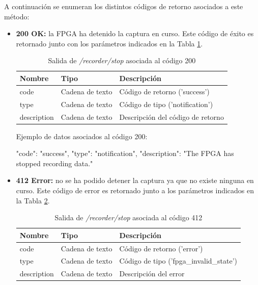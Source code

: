 A continuación se enumeran los distintos códigos de retorno asociados a este método:
\begin{itemize}

\item{\textbf{200 OK:} la \gls{FPGA} ha detenido la captura en curso. Este código de éxito es retornado junto con los parámetros indicados en la Tabla \ref{extra:api:recorderstop:ok}.
\begin{table}[H]
\centering
\begin{tabular}{|l|l|l|}
\hline
\rowcolor[HTML]{F5F5F5}
\textbf{Nombre}  & \textbf{Tipo}   & \textbf{Descripción}              \\ \hline
code             & Cadena de texto & Código de retorno ('success')     \\ \hline
type             & Cadena de texto & Código de tipo ('notification')   \\ \hline
description      & Cadena de texto & Descripción del código de retorno \\ \hline
\end{tabular}
\caption{Salida de \textit{/recorder/stop} asociada al código 200}
\label{extra:api:recorderstop:ok}
\end{table}
\begin{minipage}{\textwidth}
Ejemplo de datos asociados al código 200:

\begin{code}[language=json]
{
  "code": "success",
  "type": "notification",
  "description": "The FPGA has stopped recording data."
}
\end{code}
\end{minipage}
}

\item{\textbf{412 Error:} no se ha podido detener la captura ya que no existe ninguna en curso. Este código de error es retornado junto a los parámetros indicados en la Tabla \ref{extra:api:recorderstop:error}.
\begin{table}[H]
\centering
\begin{tabular}{|l|l|l|}
\hline
\rowcolor[HTML]{F5F5F5}
\textbf{Nombre}  & \textbf{Tipo}   & \textbf{Descripción}                    \\ \hline
code             & Cadena de texto & Código de retorno ('error')             \\ \hline
type             & Cadena de texto & Código de tipo ('fpga\_invalid\_state') \\ \hline
description      & Cadena de texto & Descripción del error                   \\ \hline
\end{tabular}
\caption{Salida de \textit{/recorder/stop} asociada al código 412}
\label{extra:api:recorderstop:error}
\end{table}

}
\end{itemize}

